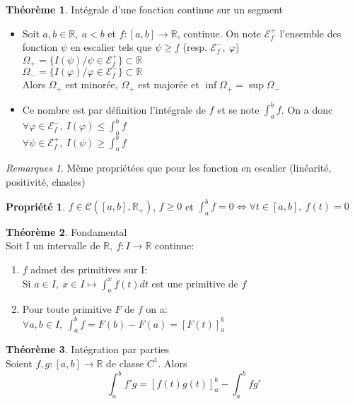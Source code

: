\documentclass[fleqn]{article}
\theoremstyle{definition} \newtheorem*{defi}{D\'efinition}
\theoremstyle{definition} \newtheorem*{theo}{Th\'eor\`eme}
\theoremstyle{definition} \newtheorem*{coro}{Corollaire}
\theoremstyle{remark} \newtheorem*{rqs}{Remarques}
\theoremstyle{definition} \newtheorem*{prop}{Propri\'et\'e}
\begin{document}
\begin{theo} Int\'egrale d'une fonction continue sur un segment
	\begin{itemize}
		\item Soit $a,b \in \mathbb{R},\ a<b$ et $f:[a,b] \rightarrow \mathbb{R}$, continue. On note $\mathcal{E}_f^+$ l'ensemble des
		fonction $\psi$
			en escalier tels que $\psi \geq f$ (resp. $\mathcal{E}_f^-,\ \varphi$) \\
			$\Omega_+ = \{I(\psi) / \psi \in \mathcal{E}_f^+\} \subset \mathbb{R}$ \\
			$\Omega_- = \{I(\varphi) / \varphi \in \mathcal{E}_f^-\} \subset \mathbb{R}$ \\
			Alors $\Omega_+$ est minor\'ee, $\Omega_+$ est major\'ee et $\inf \Omega_+ = \sup \Omega_-$
		\item Ce nombre est par d\'efinition l'int\'egrale de $f$ et se note $\int_a^b f$. On a donc\\
			$\forall \varphi \in \mathcal{E}_f^-,\ I(\varphi) \leq \int_a^b f$\\
			$\forall \psi \in \mathcal{E}_f^+,\ I(\psi) \geq \int_a^b f$
	\end{itemize}
\end{theo}

\begin{rqs} M\^eme propri\'et\'ees que pour les fonction en escalier (lin\'earit\'e, positivit\'e, chasles)
\end{rqs}

\begin{prop} $f \in \mathscr{C}([a,b], \mathbb{R}_+)$, $f \geq 0$ et $\int_a^b f = 0 \Leftrightarrow \forall t \in [a,b],\ f(t) = 0$
\end{prop}

\begin{theo} Fondamental \\
	Soit I un intervalle de $\mathbb{R},\ f:I\rightarrow \mathbb{R}$ continue:
	\begin{enumerate}
		\item $f$ admet des primitives sur I: \\
			Si $a \in I,\ x \in I \mapsto \int_a^x f(t)dt$ est une primitive de $f$
		\item Pour toute primitive $F$ de $f$ on a: \\
			$\forall a,b \in I,\ \int_a^b f = F(b) - F(a) = [F(t)]_a^b$
	\end{enumerate}
\end{theo}

\begin{theo} Int\'egration par parties \\
	Soient $f,g: [a,b] \rightarrow \mathbb{R}$ de classe $C^1$. Alors
	\[\int_a^b f'g = [f(t)g(t)]_a^b - \int_a^b fg'\]
\end{theo}
\end{document}
